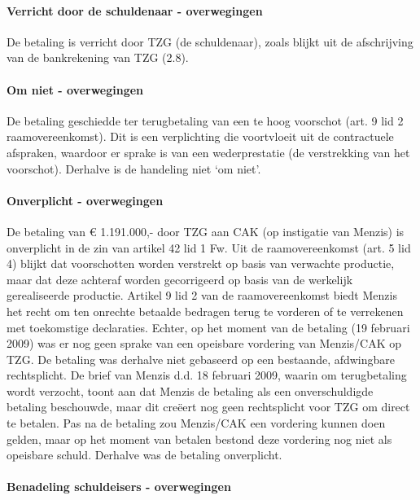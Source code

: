 \documentclass[
  dutch,
  a4paper,
]{article}
\begin{document}
\paragraph{Verricht door de schuldenaar - overwegingen}\label{verricht-door-de-schuldenaar---overwegingen-81}

De betaling is verricht door TZG (de schuldenaar), zoals blijkt uit de afschrijving van de bankrekening van TZG (2.8).

\paragraph{Om niet - overwegingen}\label{om-niet---overwegingen-81}

De betaling geschiedde ter terugbetaling van een te hoog voorschot (art. 9 lid 2 raamovereenkomst). Dit is een verplichting die voortvloeit uit de contractuele afspraken, waardoor er sprake is van een wederprestatie (de verstrekking van het voorschot). Derhalve is de handeling niet `om niet'.

\paragraph{Onverplicht - overwegingen}\label{onverplicht---overwegingen-81}

De betaling van € 1.191.000,- door TZG aan CAK (op instigatie van Menzis) is onverplicht in de zin van artikel 42 lid 1 Fw. Uit de raamovereenkomst (art. 5 lid 4) blijkt dat voorschotten worden verstrekt op basis van verwachte productie, maar dat deze achteraf worden gecorrigeerd op basis van de werkelijk gerealiseerde productie. Artikel 9 lid 2 van de raamovereenkomst biedt Menzis het recht om ten onrechte betaalde bedragen terug te vorderen of te verrekenen met toekomstige declaraties. Echter, op het moment van de betaling (19 februari 2009) was er nog geen sprake van een opeisbare vordering van Menzis/CAK op TZG. De betaling was derhalve niet gebaseerd op een bestaande, afdwingbare rechtsplicht. De brief van Menzis d.d. 18 februari 2009, waarin om terugbetaling wordt verzocht, toont aan dat Menzis de betaling als een onverschuldigde betaling beschouwde, maar dit creëert nog geen rechtsplicht voor TZG om direct te betalen. Pas na de betaling zou Menzis/CAK een vordering kunnen doen gelden, maar op het moment van betalen bestond deze vordering nog niet als opeisbare schuld. Derhalve was de betaling onverplicht.

\paragraph{Benadeling schuldeisers - overwegingen}\label{benadeling-schuldeisers---overwegingen-81}
\end{document}
